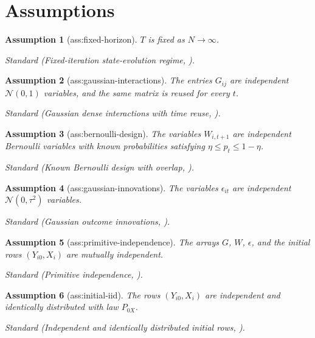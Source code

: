 \documentclass{article}
\newtheorem{assumption}{Assumption}
\begin{document}
\section{Assumptions}

\begin{assumption}[ass:fixed-horizon]\label{ass:fixed-horizon}
\(T\) is fixed as \(N\to\infty\).
\par\smallskip\noindent\emph{Standard} (Fixed-iteration state-evolution regime, \cite{BayatiMontanari2011DenseGraphs}).
\end{assumption}

\begin{assumption}[ass:gaussian-interactions]\label{ass:gaussian-interactions}
The entries \(G_{ij}\) are independent \(\mathcal N(0,1)\) variables, and the same matrix is reused for every \(t\).
\par\smallskip\noindent\emph{Standard} (Gaussian dense interactions with time reuse, \cite{ShiraniBayati2024CausalMP}).
\end{assumption}

\begin{assumption}[ass:bernoulli-design]\label{ass:bernoulli-design}
The variables \(W_{i,t+1}\) are independent Bernoulli variables with known probabilities satisfying \(\eta\le p_t\le1-\eta\).
\par\smallskip\noindent\emph{Standard} (Known Bernoulli design with overlap, \cite{ShiraniBayati2024CausalMP}).
\end{assumption}

\begin{assumption}[ass:gaussian-innovations]\label{ass:gaussian-innovations}
The variables \(\epsilon_{it}\) are independent \(\mathcal N(0,\tau^2)\) variables.
\par\smallskip\noindent\emph{Standard} (Gaussian outcome innovations, \cite{ShiraniBayati2024CausalMP}).
\end{assumption}

\begin{assumption}[ass:primitive-independence]\label{ass:primitive-independence}
The arrays \(G\), \(W\), \(\epsilon\), and the initial rows \((Y_{i0},X_i)\) are mutually independent.
\par\smallskip\noindent\emph{Standard} (Primitive independence, \cite{ShiraniBayati2024CausalMP}).
\end{assumption}

\begin{assumption}[ass:initial-iid]\label{ass:initial-iid}
The rows \((Y_{i0},X_i)\) are independent and identically distributed with law \(P_{0X}\).
\par\smallskip\noindent\emph{Standard} (Independent and identically distributed initial rows, \cite{ShiraniBayati2024CausalMP}).
\end{assumption}
\end{document}
